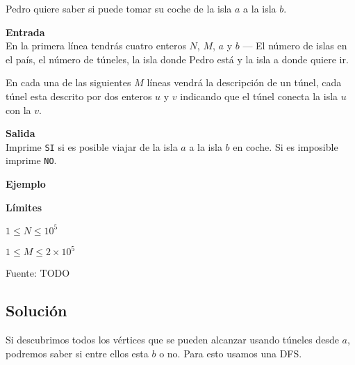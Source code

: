 Pedro quiere saber si puede tomar su coche de la isla \(a\) a la isla \(b\).

\textbf{Entrada}\\
En la primera línea tendrás cuatro enteros \(N\), \(M\), \(a\) y \(b\) --- El número de islas en el país, el número de túneles, la isla donde Pedro está y la isla a donde quiere ir.

En cada una de las siguientes \(M\) líneas vendrá la descripción de un túnel, cada túnel esta descrito por dos enteros \(u\) y \(v\) indicando que el túnel conecta la isla \(u\) con la \(v\).

\textbf{Salida}\\
Imprime \texttt{SI} si es posible viajar de la isla \(a\) a la isla \(b\) en coche. Si es imposible imprime \texttt{NO}.

\textbf{Ejemplo}\\
\begin{casebox3}
\end{casebox3}

\textbf{Límites}
\begin{plimits}
	\item \(1 \leq N \leq 10^5\)
	\item \(1 \leq M \leq 2\times10^5\)
\end{plimits}

Fuente: TODO

\subsection*{Solución} 

Si descubrimos todos los vértices que se pueden alcanzar usando túneles desde \(a\), podremos saber si entre ellos esta \(b\) o no. Para esto usamos una DFS.

